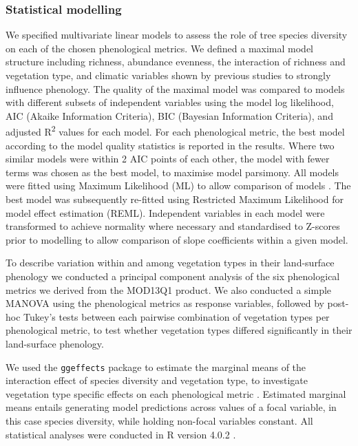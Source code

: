 \documentclass[11pt,a4paper]{article}
\begin{document}
\subsubsection{Statistical modelling}

We specified multivariate linear models to assess the role of tree species diversity on each of the chosen phenological metrics. We defined a maximal model structure including richness, abundance evenness, the interaction of richness and vegetation type, and climatic variables shown by previous studies to strongly influence phenology. The quality of the maximal model was compared to models with different subsets of independent variables using the model log likelihood, AIC (Akaike Information Criteria), BIC (Bayesian Information Criteria), and adjusted R\textsuperscript{2} values for each model. For each phenological metric, the best model according to the model quality statistics is reported in the results. Where two similar models were within 2 AIC points of each other, the model with fewer terms was chosen as the best model, to maximise model parsimony. All models were fitted using Maximum Likelihood (ML) to allow comparison of models \citep{Zuur2009}. The best model was subsequently re-fitted using Restricted Maximum Likelihood for model effect estimation (REML). Independent variables in each model were transformed to achieve normality where necessary and standardised to Z-scores prior to modelling to allow comparison of slope coefficients within a given model.

To describe variation within and among vegetation types in their land-surface phenology we conducted a principal component analysis of the six phenological metrics we derived from the MOD13Q1 product. We also conducted a simple MANOVA using the phenological metrics as response variables, followed by post-hoc Tukey's tests between each pairwise combination of vegetation types per phenological metric, to test whether vegetation types differed significantly in their land-surface phenology.

We used the \texttt{ggeffects} package to estimate the marginal means of the interaction effect of species diversity and vegetation type, to investigate vegetation type specific effects on each phenological metric \citep{ggeffects}. Estimated marginal means entails generating model predictions across values of a focal variable, in this case species diversity, while holding non-focal variables constant. All statistical analyses were conducted in R version 4.0.2 \citep{R2020}.
\end{document}

